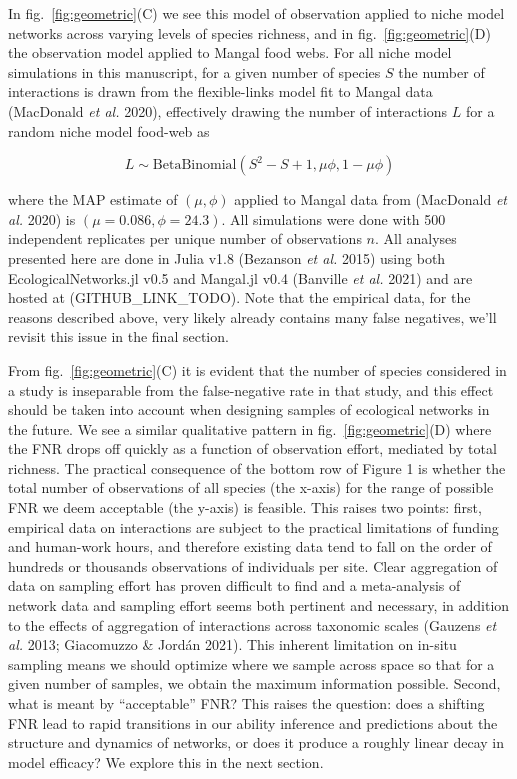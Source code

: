 \documentclass[10pt,oneside]{article}
\begin{document}
In fig.~\ref{fig:geometric}(C) we see this model of observation applied
to niche model networks across varying levels of species richness, and
in fig.~\ref{fig:geometric}(D) the observation model applied to Mangal
food webs. For all niche model simulations in this manuscript, for a
given number of species \(S\) the number of interactions is drawn from
the flexible-links model fit to Mangal data (MacDonald \emph{et al.}
2020), effectively drawing the number of interactions \(L\) for a random
niche model food-web as

\[L \sim  \text{BetaBinomial}(S^2-S+1,\mu\phi, 1-\mu\phi)\]

where the MAP estimate of \((\mu, \phi)\) applied to Mangal data from
(MacDonald \emph{et al.} 2020) is \((\mu=0.086, \phi=24.3)\). All
simulations were done with 500 independent replicates per unique number
of observations \(n\). All analyses presented here are done in Julia
v1.8 (Bezanson \emph{et al.} 2015) using both EcologicalNetworks.jl v0.5
and Mangal.jl v0.4 (Banville \emph{et al.} 2021) and are hosted at
(GITHUB\_LINK\_TODO). Note that the empirical data, for the reasons
described above, very likely already contains many false negatives,
we'll revisit this issue in the final section.

From fig.~\ref{fig:geometric}(C) it is evident that the number of
species considered in a study is inseparable from the false-negative
rate in that study, and this effect should be taken into account when
designing samples of ecological networks in the future. We see a similar
qualitative pattern in fig.~\ref{fig:geometric}(D) where the FNR drops
off quickly as a function of observation effort, mediated by total
richness. The practical consequence of the bottom row of Figure 1 is
whether the total number of observations of all species (the x-axis) for
the range of possible FNR we deem acceptable (the y-axis) is feasible.
This raises two points: first, empirical data on interactions are
subject to the practical limitations of funding and human-work hours,
and therefore existing data tend to fall on the order of hundreds or
thousands observations of individuals per site. Clear aggregation of
data on sampling effort has proven difficult to find and a meta-analysis
of network data and sampling effort seems both pertinent and necessary,
in addition to the effects of aggregation of interactions across
taxonomic scales (Gauzens \emph{et al.} 2013; Giacomuzzo \& Jordán
2021). This inherent limitation on in-situ sampling means we should
optimize where we sample across space so that for a given number of
samples, we obtain the maximum information possible. Second, what is
meant by ``acceptable'' FNR? This raises the question: does a shifting
FNR lead to rapid transitions in our ability inference and predictions
about the structure and dynamics of networks, or does it produce a
roughly linear decay in model efficacy? We explore this in the next
section.
\end{document}
